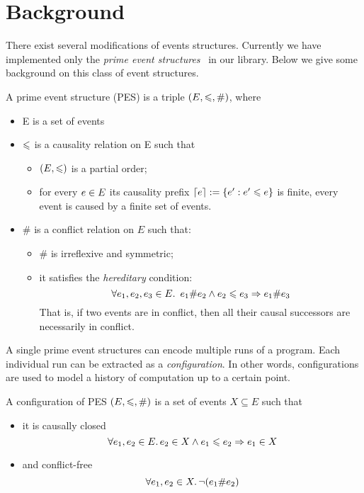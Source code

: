 \section{Background}

There exist several modifications of events structures.
Currently we have implemented only 
the \emph{prime event structures}~\cite{Winskel:86} in our library. 
Below we give some background on this class of event structures. 

\begin{definition} 
\label{es_def}
A prime event structure (PES) is a triple $(E, \leqslant, \#)$, where
\begin{itemize}
  \item E is a set of events
  \item $\leqslant$ is a causality relation on E such that 
  \begin{itemize}
    \item $ (E, \leqslant) $ is a partial order;
    \item for every $e \in E$ its causality prefix ${\lceil e \rceil := \{ e' : e' \leqslant e \}}$ 
      is finite, \ie every event is caused by a finite set of events.
  \end{itemize}
  \item $\#$ is a conflict relation on $E$ such that:
  \begin{itemize}
    \item $\#$ is irreflexive and symmetric;
    \item it satisfies the \emph{hereditary} condition:
    $$ \forall e_1, e_2, e_3 \in E \ldotp \ e_1 \# e_2 \land e_2 \leqslant e_3 \Rightarrow e_1 \# e_3 $$
      That is, if two events are in conflict, then all their causal successors 
      are necessarily in conflict.
  \end{itemize}
\end{itemize}
\end{definition}

A single prime event structures can encode multiple runs of a program.
Each individual run can be extracted as a \emph{configuration}. 
In other words, configurations are used to model 
a history of computation up to a certain point.

\begin{definition}
A configuration of PES $(E, \leqslant, \#)$ is a set of events $X \subseteq E$ such that
\begin{itemize}
  \item it is causally closed 
    $$ \forall e_1, e_2 \in E \ldotp e_2 \in X \land e_1 \leqslant e_2 \Rightarrow e_1 \in X $$
  \item and conflict-free 
    $$ \forall e_1, e_2 \in X \ldotp \neg (e_1 \# e_2) $$
\end{itemize}
\end{definition}

